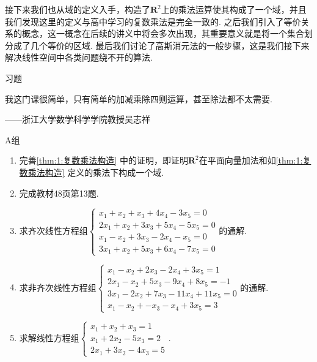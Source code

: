 接下来我们也从域的定义入手，构造了$\mathbf{R}^2$上的乘法运算使其构成了一个域，并且我们发现这里的定义与高中学习的复数乘法是完全一致的. 之后我们引入了等价关系的概念，这一概念在后续的讲义中将会多次出现，其重要意义就是将一个集合划分成了几个等价的区域. 最后我们讨论了高斯消元法的一般步骤，这是我们接下来解决线性空间中各类问题绕不开的算法.

\vspace{2ex}
\centerline{\heiti \Large 习题}

\vspace{2ex}
{\kaishu 我这门课很简单，只有简单的加减乘除四则运算，甚至除法都不太需要.}
\begin{flushright}
    \kaishu
    ——浙江大学数学科学学院教授吴志祥
\end{flushright}

\centerline{\heiti A组}
\begin{enumerate}
    \item 完善\autoref{thm:1:复数乘法构造} 中的证明，即证明$\mathbf{R}^2$在平面向量加法和如\autoref*{thm:1:复数乘法构造} 定义的乘法下构成一个域.

    \item 完成教材48页第13题.

    \item 求齐次线性方程组$\begin{cases}
                  x_1+x_2+x_3+4x_4-3x_5=0   \\
                  2x_1+x_2+3x_3+5x_4-5x_5=0 \\
                  x_1-x_2+3x_3-2x_4-x_5=0   \\
                  3x_1+x_2+5x_3+6x_4-7x_5=0
              \end{cases}$的通解.

    \item 求非齐次线性方程组$\begin{cases}
                  x_1-x_2+2x_3-2x_4+3x_5=1     \\
                  2x_1-x_2+5x_3-9x_4+8x_5=-1   \\
                  3x_1-2x_2+7x_3-11x_4+11x_5=0 \\
                  x_1-x_2+-x_3-x_4+3x_5=3
              \end{cases}$的通解.

    \item 求解线性方程组$\begin{cases}
                  x_1+x_2+x_3=1   \\
                  x_1+2x_2-5x_3=2 \\
                  2x_1+3x_2-4x_3=5
              \end{cases}$.
\end{enumerate}

